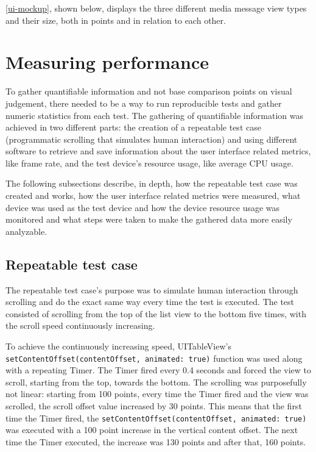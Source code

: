 \documentclass[a4paper,12pt]{article}
\begin{document}
\autoref{ui-mockup}, shown below, displays the three different media message view types and their size, both in points and in relation to each other.

\section{Measuring performance}
To gather quantifiable information and not base comparison points on visual judgement, there needed to be a way to run reproducible tests and gather numeric statistics from each test. The gathering of quantifiable information was achieved in two different parts: the creation of a repeatable test case (programmatic scrolling that simulates human interaction) and using different software to retrieve and save information about the user interface related metrics, like frame rate, and the test device's resource usage, like average CPU usage.

The following subsections describe, in depth, how the repeatable test case was created and works, how the user interface related metrics were measured, what device was used as the test device and how the device resource usage was monitored and what steps were taken to make the gathered data more easily analyzable. 

\subsection{Repeatable test case}
\label{subsec:repeatable-test-case}
The repeatable test case's purpose was to simulate human interaction through scrolling and do the exact same way every time the test is executed. The test consisted of scrolling from the top of the list view to the bottom five times, with the scroll speed continuously increasing.

To achieve the continuously increasing speed, UITableView's \texttt{setContentOffset(contentOffset, animated: true)} function was used along with a repeating Timer. The Timer fired every 0.4 seconds and forced the view to scroll, starting from the top, towards the bottom. The scrolling was purposefully not linear: starting from 100 points, every time the Timer fired and the view was scrolled, the scroll offset value increased by 30 points. This means that the first time the Timer fired, the \texttt{setContentOffset(contentOffset, animated: true)} was executed with a 100 point increase in the vertical content offset. The next time the Timer executed, the increase was 130 points and after that, 160 points.
\end{document}
